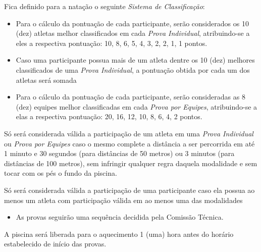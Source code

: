 \noindent
Fica definido para a natação o seguinte \textit{Sistema de Classificação}:
\begin{itemize}[noitemsep]
	\item Para o cálculo da pontuação de cada participante, serão considerados os 10 (dez) atletas melhor classificados em cada \textit{Prova Individual}, atribuindo-se a eles a respectiva pontuação: 10, 8, 6, 5, 4, 3, 2, 2, 1, 1 pontos.
	\item Caso uma participante possua mais de um atleta dentre os 10 (dez) melhores classificados de uma \textit{Prova Individual}, a pontuação obtida por cada um dos atletas será somada
	\item Para o cálculo da pontuação de cada participante, serão consideradas as 8 (dez) equipes melhor	classificadas em cada \textit{Prova por Equipes}, atribuindo-se a elas a respectiva pontuação: 20, 16, 12, 10, 8, 6, 4, 2 pontos.
\end{itemize}

\noindent
Só será considerada válida a participação de um atleta em uma \textit{Prova Individual} ou \textit{Prova por Equipes} caso o mesmo complete a distância a ser percorrida em até 1 minuto e 30 segundos (para distâncias de 50 metros) ou 3 minutos (para distâncias de 100 metros), sem infringir qualquer regra daquela modalidade e sem tocar com os pés o fundo da piscina.

\noindent
Só será considerada válida a participação de uma participante caso ela possua ao menos um atleta com participação válida em ao menos uma das modalidades
\begin{itemize}[noitemsep]
	\item As provas seguirão uma sequência decidida pela Comissão Técnica.
\end{itemize}

\begin{article}
	A piscina será liberada para o aquecimento 1 (uma) hora antes do horário estabelecido de início das provas.
\end{article}
